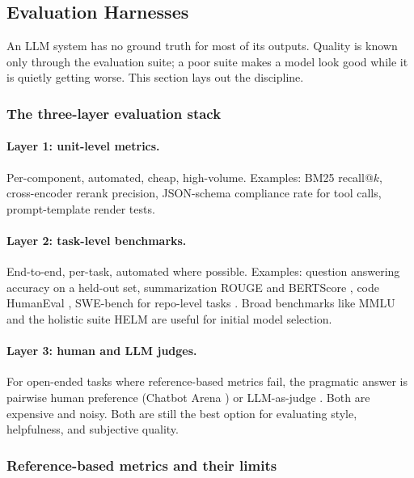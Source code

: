 \subsection{Evaluation Harnesses}

An LLM system has no ground truth for most of its outputs. Quality
is known only through the evaluation suite; a poor suite makes a
model look good while it is quietly getting worse. This section
lays out the discipline.

\subsubsection{The three-layer evaluation stack}

\paragraph{Layer 1: unit-level metrics.} Per-component, automated,
cheap, high-volume. Examples: BM25 recall@$k$, cross-encoder
rerank precision, JSON-schema compliance rate for tool calls,
prompt-template render tests.

\paragraph{Layer 2: task-level benchmarks.} End-to-end, per-task,
automated where possible. Examples: question answering accuracy
on a held-out set, summarization ROUGE \citep{lin2004rouge} and
BERTScore \citep{zhang2020bertscore}, code HumanEval
\citep{chen2021humaneval}, SWE-bench for repo-level tasks
\citep{jimenez2024swebench}. Broad benchmarks like MMLU
\citep{hendrycks2021mmlu} and the holistic suite HELM
\citep{liang2023helm} are useful for initial model selection.

\paragraph{Layer 3: human and LLM judges.} For open-ended tasks
where reference-based metrics fail, the pragmatic answer is
pairwise human preference (Chatbot Arena
\citep{chiang2024arena}) or LLM-as-judge
\citep{zheng2023llmjudge}. Both are expensive and noisy. Both are
still the best option for evaluating style, helpfulness, and
subjective quality.

\subsubsection{Reference-based metrics and their limits}


